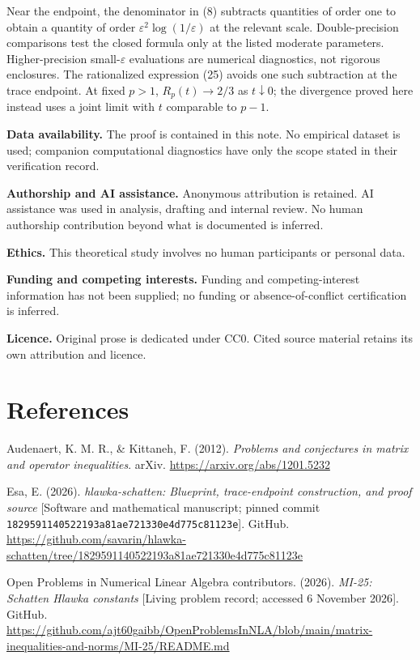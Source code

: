 \documentclass[11pt,a4paper]{article}
\begin{document}
Near the endpoint, the denominator in (8) subtracts quantities of order one to obtain a quantity of order \(\varepsilon^2\log(1/\varepsilon)\) at the relevant scale. Double-precision comparisons test the closed formula only at the listed moderate parameters. Higher-precision small-\(\varepsilon\) evaluations are numerical diagnostics, not rigorous enclosures. The rationalized expression (25) avoids one such subtraction at the trace endpoint. At fixed \(p>1\), \(R_p(t)\to2/3\) as \(t\downarrow0\); the divergence proved here instead uses a joint limit with \(t\) comparable to \(p-1\).

\textbf{Data availability.} The proof is contained in this note. No empirical dataset is used; companion computational diagnostics have only the scope stated in their verification record.

\textbf{Authorship and AI assistance.} Anonymous attribution is retained. AI assistance was used in analysis, drafting and internal review. No human authorship contribution beyond what is documented is inferred.

\textbf{Ethics.} This theoretical study involves no human participants or personal data.

\textbf{Funding and competing interests.} Funding and competing-interest information has not been supplied; no funding or absence-of-conflict certification is inferred.

\textbf{Licence.} Original prose is dedicated under CC0. Cited source material retains its own attribution and licence.

\section*{References}\label{references}

Audenaert, K. M. R., \& Kittaneh, F. (2012). \emph{Problems and conjectures in matrix and operator inequalities}. arXiv. \url{https://arxiv.org/abs/1201.5232}

Esa, E. (2026). \emph{hlawka-schatten: Blueprint, trace-endpoint construction, and proof source} {[}Software and mathematical manuscript; pinned commit \nolinkurl{1829591140522193a81ae721330e4d775c81123e}{]}. GitHub. \url{https://github.com/savarin/hlawka-schatten/tree/1829591140522193a81ae721330e4d775c81123e}

Open Problems in Numerical Linear Algebra contributors. (2026). \emph{MI-25: Schatten Hlawka constants} {[}Living problem record; accessed 6 November 2026{]}. GitHub. \url{https://github.com/ajt60gaibb/OpenProblemsInNLA/blob/main/matrix-inequalities-and-norms/MI-25/README.md}
\end{document}
